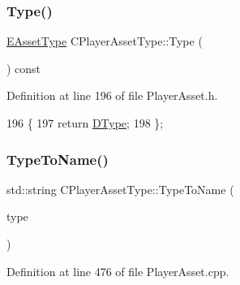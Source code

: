 \subsubsection{\texorpdfstring{Type()}{Type()}}
{\footnotesize\ttfamily \hyperlink{GameDataTypes_8h_a5600d4fc433b83300308921974477fec}{E\+Asset\+Type} C\+Player\+Asset\+Type\+::\+Type (\begin{DoxyParamCaption}{ }\end{DoxyParamCaption}) const\hspace{0.3cm}{\ttfamily [inline]}}



Definition at line 196 of file Player\+Asset.\+h.


\begin{DoxyCode}
196                                \{
197             \textcolor{keywordflow}{return} \hyperlink{classCPlayerAssetType_a2a52bda918a79ecf5582314ef1f61c8a}{DType};  
198         \};
\end{DoxyCode}
\hypertarget{classCPlayerAssetType_a66ce89c35b74940e9fc947a1f4b9e770}{}\label{classCPlayerAssetType_a66ce89c35b74940e9fc947a1f4b9e770} 
\subsubsection{\texorpdfstring{Type\+To\+Name()}{TypeToName()}}
{\footnotesize\ttfamily std\+::string C\+Player\+Asset\+Type\+::\+Type\+To\+Name (\begin{DoxyParamCaption}\item[{\hyperlink{GameDataTypes_8h_a5600d4fc433b83300308921974477fec}{E\+Asset\+Type}}]{type }\end{DoxyParamCaption})\hspace{0.3cm}{\ttfamily [static]}}



Definition at line 476 of file Player\+Asset.\+cpp.


